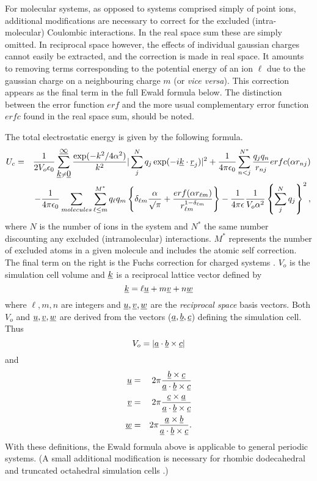 For molecular systems, as opposed to systems comprised simply of point
ions, additional modifications are necessary to correct for the
excluded (intra-molecular) Coulombic interactions.  In the real space
sum these are simply omitted. In reciprocal space however, the effects
of individual gaussian charges cannot easily be extracted, and the
correction is made in real space.  It amounts to removing terms
corresponding to the potential energy of an ion $\ell$ due to the
gaussian charge on a neighbouring charge $m$ (or {\em vice versa}).
This correction appears as the final term in the full Ewald formula
below.  The distinction between the error function $erf$ and the more
usual complementary error function $erfc$ found in the real space sum,
should be noted.

The total electrostatic energy is given by the following formula.
\begin{eqnarray}
U_{c}&=&\frac{1}{2V_{o}\epsilon_{0}}
 \sum_{\mbox{$\underline{k}$}\neq\mbox{$\underline{0}$}}^{\mbox{$\underline{\infty}$}}
\frac{\exp(-k^{2}/4\alpha^{2})}{k^{2}}
|\sum_{j}^{N}q_{j}\exp(-i\mbox{$\underline{k}$}\cdot\mbox{$\underline{r}$}_{j})|^{2}+
\frac{1}{4\pi\epsilon_{0}}\sum_{n<j}^{N^{*}}\frac{q_{j}q_{n}}{r_{nj}}
erfc(\alpha r_{nj}) \nonumber\\
& &-\frac{1}{4\pi\epsilon_{0}}
\sum_{molecules}\sum_{\ell\le m}^{M^{*}}q_{\ell}q_{m}\left\{\delta_{\ell m}
\frac{\alpha}{\surd \pi}+\frac{erf(\alpha r_{\ell m})}{r_{\ell
m}^{1-\delta_{\ell m}}}\right \}
-\frac{1}{4\pi\epsilon}\frac{1}{V_{o}\alpha^{2}} \left
    \{\sum_{j}^{N}q_{j}\right \}^{2},
\end{eqnarray}
where $N$ is the number of ions in the system and $N^{*}$ the same
number discounting any excluded (intramolecular) interactions.
$M^{*}$ represents the number of excluded atoms in a given molecule
and includes the atomic self correction. The final term on the right is the
Fuchs correction for charged systems \cite{fuchs-35a}.
$V_{o}$ is the simulation cell volume and $\mbox{$\underline{k}$}$ is a reciprocal
lattice vector defined by
\begin{equation}
\mbox{$\underline{k}$}=\ell \mbox{$\underline{u}$} + m \mbox{$\underline{v}$} + n \mbox{$\underline{w}$} \label{k-vector}
\end{equation}
where $\ell,m,n$ are integers and $\mbox{$\underline{u}$},\mbox{$\underline{v}$},\mbox{$\underline{w}$}$ are the
{\em reciprocal space} basis vectors.  Both $V_{o}$ and
$\mbox{$\underline{u}$},\mbox{$\underline{v}$},\mbox{$\underline{w}$}$ are derived from the vectors
($\mbox{$\underline{a}$},\mbox{$\underline{b}$},\mbox{$\underline{c}$}$) defining the simulation cell. Thus
\begin{equation}
V_{o}=|\mbox{$\underline{a}$}\cdot\mbox{$\underline{b}$}\times\mbox{$\underline{c}$}|
\end{equation}
and
\begin{eqnarray}
\mbox{$\underline{u}$}&=&2\pi\frac{\mbox{$\underline{b}$}\times
\mbox{$\underline{c}$}}{\mbox{$\underline{a}$}\cdot\mbox{$\underline{b}$}\times\mbox{$\underline{c}$}}
\nonumber \\
\mbox{$\underline{v}$}&=&2\pi\frac{\mbox{$\underline{c}$}\times \mbox{$\underline{a}$}}{\mbox{$\underline{a}$}\cdot\mbox{$\underline{b}$}\times\mbox{$\underline{c}$}}\\
\mbox{$\underline{w}$}&=&2\pi\frac{\mbox{$\underline{a}$}\times
\mbox{$\underline{b}$}}{\mbox{$\underline{a}$}\cdot\mbox{$\underline{b}$}\times\mbox{$\underline{c}$}}.
\nonumber 
\end{eqnarray}
With these definitions, the Ewald formula above is applicable to
general periodic systems. (A small additional modification is necessary
for rhombic dodecahedral and truncated octahedral simulation cells
\cite{smith-93b}.)

